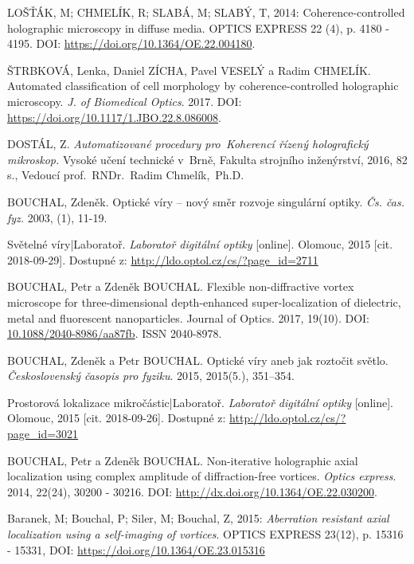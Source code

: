 \documentclass[12pt, a4paper, twoside]{article}
\begin{document}
\begin{thebibliography}{30}
  LOŠŤÁK, M; CHMELÍK, R; SLABÁ, M; SLABÝ, T, 2014: Coherence-controlled holographic microscopy in diffuse media. OPTICS EXPRESS 22 (4), p. 4180 - 4195. DOI: \url{https://doi.org/10.1364/OE.22.004180}.

   ŠTRBKOVÁ, Lenka, Daniel ZÍCHA, Pavel VESELÝ a Radim CHMELÍK. Automated classification of cell morphology by coherence-controlled holographic microscopy. \textit{J. of Biomedical Optics}. 2017. DOI: \url{https://doi.org/10.1117/1.JBO.22.8.086008}.

   DOSTÁL, Z. \emph{Automatizované procedury pro~Koherencí řízený holografický mikroskop.} Vysoké učení technické v~Brně, Fakulta strojního inženýrství, 2016, 82 s., Vedoucí prof.~RNDr.~Radim Chmelík,~Ph.D.

  BOUCHAL, Zdeněk. Optické víry -- nový směr rozvoje singulární optiky. \emph{Čs. čas. fyz.} 2003, (1), 11-19.

  Světelné víry|Laboratoř. \textit{Laboratoř digitální optiky} [online]. Olomouc, 2015 [cit. 2018-09-29]. Dostupné z: \url{http://ldo.optol.cz/cs/?page_id=2711}

  BOUCHAL, Petr a Zdeněk BOUCHAL. Flexible non-diffractive vortex microscope for three-dimensional depth-enhanced super-localization of dielectric, metal and fluorescent nanoparticles. Journal of Optics. 2017, 19(10). DOI: \url{10.1088/2040-8986/aa87fb}. ISSN 2040-8978.

  BOUCHAL, Zdeněk a Petr BOUCHAL. Optické víry aneb jak roztočit světlo. \textit{Československý časopis pro fyziku}. 2015, 2015(5.), 351--354.

  Prostorová lokalizace mikročástic|Laboratoř. \textit{Laboratoř digitální optiky} [online]. Olomouc, 2015 [cit. 2018-09-26]. Dostupné z: \url{http://ldo.optol.cz/cs/?page\_id=3021}

  BOUCHAL, Petr a Zdeněk BOUCHAL. Non-iterative holographic axial localization using complex amplitude of diffraction-free vortices. \emph{Optics express}. 2014, 22(24), 30200 - 30216. DOI: \url{http://dx.doi.org/10.1364/OE.22.030200}.

  Baranek, M; Bouchal, P; Siler, M; Bouchal, Z, 2015: \textit{Aberration resistant axial localization using a self-imaging of vortices}. OPTICS EXPRESS 23(12), p. 15316 - 15331, DOI: \url{https://doi.org/10.1364/OE.23.015316}

\end{thebibliography}



\end{document}
